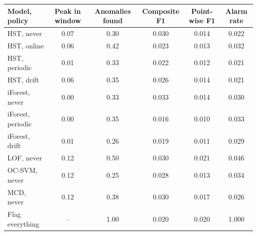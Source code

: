 \begin{tabular}{lccccc}
\toprule
Model, policy & Peak in window & Anomalies found & Composite F1 & Point-wise F1 & Alarm rate \\
\midrule
HST, never & 0.07 & 0.30 & 0.030 & 0.014 & 0.022 \\
HST, online & 0.06 & 0.42 & 0.023 & 0.013 & 0.032 \\
HST, periodic & 0.01 & 0.33 & 0.022 & 0.012 & 0.021 \\
HST, drift & 0.06 & 0.35 & 0.026 & 0.014 & 0.021 \\
iForest, never & 0.00 & 0.33 & 0.033 & 0.014 & 0.030 \\
iForest, periodic & 0.00 & 0.35 & 0.016 & 0.010 & 0.033 \\
iForest, drift & 0.01 & 0.26 & 0.019 & 0.011 & 0.029 \\
LOF, never & 0.12 & 0.50 & 0.030 & 0.021 & 0.046 \\
OC-SVM, never & 0.12 & 0.25 & 0.028 & 0.013 & 0.034 \\
MCD, never & 0.12 & 0.38 & 0.030 & 0.017 & 0.026 \\
\midrule
Flag everything & -- & 1.00 & 0.020 & 0.020 & 1.000 \\
\bottomrule
\end{tabular}
